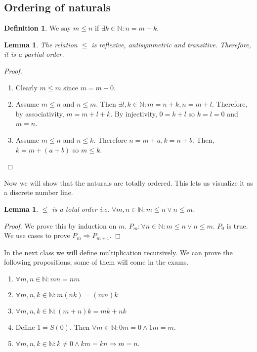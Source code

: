 \documentclass{article}
\newcommand\N{\ensuremath{\mathbb{N}}}
\newtheorem{lemma}[theorem]{Lemma}
\theoremstyle{definition}
\newtheorem{definition}{Definition}[subsection]
\theoremstyle{remark}
\theoremstyle{plain}
\begin{document}
\subsection{Ordering of naturals}

\begin{definition}
    We say \(m \leq n\) if \(\exists k \in \N : n = m + k\).
\end{definition}

\begin{lemma}
    The relation \(\leq\) is reflexive, antisymmetric and transitive. Therefore, it is a partial order.
\end{lemma}
\begin{proof}
    \begin{enumerate}
        \item Clearly \(m \leq m\) since \(m = m + 0\).
        \item Assume \(m \leq n\) and \(n \leq m\). Then \(\exists l,k \in \N: m = n + k, n = m + l\). Therefore, 
        by associativity, \(m = m + l + k\). By injectivity, \( 0 = k + l\) so \(k = l = 0\) and \(m = n\).
        \item Assume \(m \leq n\) and \(n \leq k\). Therefore \(n = m + a, k = n + b\). Then, \(k = m + (a+b)\) so \(m \leq k\).
    \end{enumerate}
\end{proof}
Now we will show that the naturals are totally ordered. This lets us visualize it as a discrete number line.

\begin{lemma}
    \(\leq\) is a total order i.e. \(\forall m,n \in \N: m \leq n \lor n \leq m\).
\end{lemma}
\begin{proof}
    We prove this by induction on \(m\). \(P_m: \forall n \in \N: m \leq n \lor n \leq m\).
    \(P_0\) is true. We use cases to prove \(P_m \Rightarrow P_{m+1}\).
\end{proof}

In the next class we will define multiplication recursively. We can prove the following propositions, some of them will come in the exams. 

\begin{enumerate}
    \item \(\forall m,n \in \N: mn = nm\)
    \item \(\forall m,n,k \in \N: m(nk) = (mn)k\)
    \item \(\forall m,n,k \in \N: (m+n)k = mk + nk\)
    \item Define \(1 = S(0)\). Then \(\forall m \in \N : 0m = 0 \land 1m = m\).
    \item \(\forall m,n,k \in \N: k\neq 0 \land km = kn \Rightarrow m =n\).
\end{enumerate}
\end{document}
